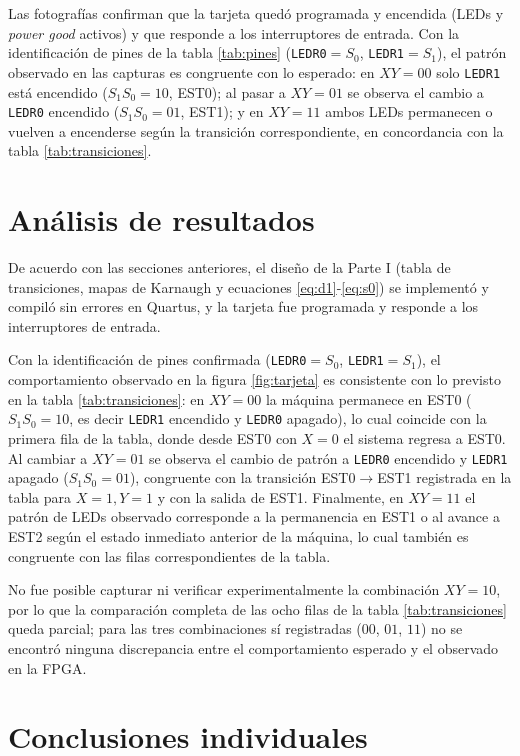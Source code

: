 Las fotografías confirman que la tarjeta quedó programada y encendida (LEDs y
\textit{power good} activos) y que responde a los interruptores de entrada. Con la
identificación de pines de la tabla \ref{tab:pines} (\texttt{LEDR0}$=S_0$,
\texttt{LEDR1}$=S_1$), el patrón observado en las capturas es congruente con lo
esperado: en $XY=00$ solo \texttt{LEDR1} está encendido ($S_1S_0=10$, EST0); al pasar
a $XY=01$ se observa el cambio a \texttt{LEDR0} encendido ($S_1S_0=01$, EST1); y en
$XY=11$ ambos LEDs permanecen o vuelven a encenderse según la transición
correspondiente, en concordancia con la tabla \ref{tab:transiciones}.

\section{Análisis de resultados}

De acuerdo con las secciones anteriores, el diseño de la Parte I (tabla de transiciones,
mapas de Karnaugh y ecuaciones \ref{eq:d1}-\ref{eq:s0}) se implementó y compiló sin
errores en Quartus, y la tarjeta fue programada y responde a los interruptores de
entrada.

Con la identificación de pines confirmada (\texttt{LEDR0}$=S_0$, \texttt{LEDR1}$=S_1$),
el comportamiento observado en la figura \ref{fig:tarjeta} es consistente con lo
previsto en la tabla \ref{tab:transiciones}: en $XY=00$ la máquina permanece en EST0
($S_1S_0=10$, es decir \texttt{LEDR1} encendido y \texttt{LEDR0} apagado), lo cual
coincide con la primera fila de la tabla, donde desde EST0 con $X=0$ el sistema
regresa a EST0. Al cambiar a $XY=01$ se observa el cambio de patrón a
\texttt{LEDR0} encendido y \texttt{LEDR1} apagado ($S_1S_0=01$), congruente con la
transición EST0$\to$EST1 registrada en la tabla para $X=1,Y=1$ y con la salida de
EST1. Finalmente, en $XY=11$ el patrón de LEDs observado corresponde a la
permanencia en EST1 o al avance a EST2 según el estado inmediato anterior de la
máquina, lo cual también es congruente con las filas correspondientes de la tabla.

No fue posible capturar ni verificar experimentalmente la combinación $XY=10$, por lo
que la comparación completa de las ocho filas de la tabla \ref{tab:transiciones}
queda parcial; para las tres combinaciones sí registradas ($00$, $01$, $11$) no se
encontró ninguna discrepancia entre el comportamiento esperado y el observado en la
FPGA.

\section{Conclusiones individuales}

